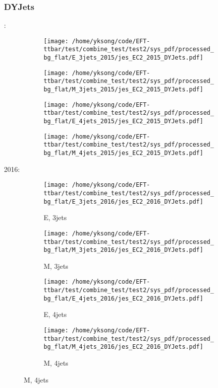 \documentclass{beamer}
\begin{document}
\begin{frame}
\frametitle{DYJets}
\fontsize{5}{1}:
\begin{figure}
\centering
\begin{subfigure}[b]{0.24\textwidth}
\texttt{[image: /home/yksong/code/EFT-ttbar/test/combine\_test/test2/sys\_pdf/processed\_bg\_flat/E\_3jets\_2015/jes\_EC2\_2015\_DYJets.pdf]}
\end{subfigure}
\begin{subfigure}[b]{0.24\textwidth}
\texttt{[image: /home/yksong/code/EFT-ttbar/test/combine\_test/test2/sys\_pdf/processed\_bg\_flat/M\_3jets\_2015/jes\_EC2\_2015\_DYJets.pdf]}
\end{subfigure}
\begin{subfigure}[b]{0.24\textwidth}
\texttt{[image: /home/yksong/code/EFT-ttbar/test/combine\_test/test2/sys\_pdf/processed\_bg\_flat/E\_4jets\_2015/jes\_EC2\_2015\_DYJets.pdf]}
\end{subfigure}
\begin{subfigure}[b]{0.24\textwidth}
\texttt{[image: /home/yksong/code/EFT-ttbar/test/combine\_test/test2/sys\_pdf/processed\_bg\_flat/M\_4jets\_2015/jes\_EC2\_2015\_DYJets.pdf]}
\end{subfigure}
\end{figure}
2016:
\begin{figure}
\centering
\begin{subfigure}[b]{0.24\textwidth}
\texttt{[image: /home/yksong/code/EFT-ttbar/test/combine\_test/test2/sys\_pdf/processed\_bg\_flat/E\_3jets\_2016/jes\_EC2\_2016\_DYJets.pdf]}
\captionsetup{font=tiny}
\caption{E, 3jets}
\end{subfigure}
\begin{subfigure}[b]{0.24\textwidth}
\texttt{[image: /home/yksong/code/EFT-ttbar/test/combine\_test/test2/sys\_pdf/processed\_bg\_flat/M\_3jets\_2016/jes\_EC2\_2016\_DYJets.pdf]}
\captionsetup{font=tiny}
\caption{M, 3jets}
\end{subfigure}
\begin{subfigure}[b]{0.24\textwidth}
\texttt{[image: /home/yksong/code/EFT-ttbar/test/combine\_test/test2/sys\_pdf/processed\_bg\_flat/E\_4jets\_2016/jes\_EC2\_2016\_DYJets.pdf]}
\captionsetup{font=tiny}
\caption{E, 4jets}
\end{subfigure}
\begin{subfigure}[b]{0.24\textwidth}
\texttt{[image: /home/yksong/code/EFT-ttbar/test/combine\_test/test2/sys\_pdf/processed\_bg\_flat/M\_4jets\_2016/jes\_EC2\_2016\_DYJets.pdf]}
\captionsetup{font=tiny}
\caption{M, 4jets}
\end{subfigure}
\end{figure}
\end{frame}
\end{document}
